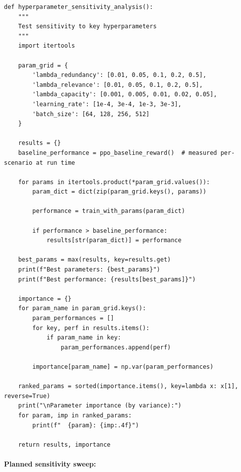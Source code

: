 \documentclass[10pt, letterpaper]{article}
\begin{document}
\begin{lstlisting}
def hyperparameter_sensitivity_analysis():
    """
    Test sensitivity to key hyperparameters
    """
    import itertools

    param_grid = {
        'lambda_redundancy': [0.01, 0.05, 0.1, 0.2, 0.5],
        'lambda_relevance': [0.01, 0.05, 0.1, 0.2, 0.5],
        'lambda_capacity': [0.001, 0.005, 0.01, 0.02, 0.05],
        'learning_rate': [1e-4, 3e-4, 1e-3, 3e-3],
        'batch_size': [64, 128, 256, 512]
    }

    results = {}
    baseline_performance = ppo_baseline_reward()  # measured per-scenario at run time

    for params in itertools.product(*param_grid.values()):
        param_dict = dict(zip(param_grid.keys(), params))

        performance = train_with_params(param_dict)

        if performance > baseline_performance:
            results[str(param_dict)] = performance

    best_params = max(results, key=results.get)
    print(f"Best parameters: {best_params}")
    print(f"Best performance: {results[best_params]}")

    importance = {}
    for param_name in param_grid.keys():
        param_performances = []
        for key, perf in results.items():
            if param_name in key:
                param_performances.append(perf)

        importance[param_name] = np.var(param_performances)

    ranked_params = sorted(importance.items(), key=lambda x: x[1], reverse=True)
    print("\nParameter importance (by variance):")
    for param, imp in ranked_params:
        print(f"  {param}: {imp:.4f}")

    return results, importance
\end{lstlisting}

\paragraph{Planned sensitivity sweep:}
\end{document}
